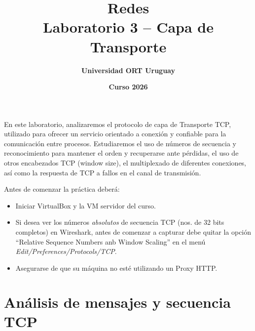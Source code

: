 \documentclass[a4paper,10pt]{article}
\title{\bf Redes\\Laboratorio 3 -- Capa de Transporte}
\author{\bf Universidad ORT Uruguay}
\date{\bf Curso 2026}
\begin{document}
\maketitle
\thispagestyle{fancy}

En este laboratorio, analizaremos el protocolo de capa de Transporte TCP, utilizado para ofrecer un servicio orientado a conexión y confiable para la comunicación entre procesos. Estudiaremos el uso de números de secuencia y reconocimiento para mantener el orden y recuperarse ante pérdidas, el uso de otros encabezados TCP (window size), el multiplexado de diferentes conexiones, así como la respuesta de TCP a fallos en el canal de transmisión.

Antes de comenzar la práctica deberá:
\begin{itemize}
    \item Iniciar VirtualBox y la VM servidor del curso.
    \item Si desea ver los números \emph{absolutos} de secuencia TCP (nos. de 32 bits completos) en Wireshark, antes de comenzar a capturar debe quitar la opción ``Relative Sequence Numbers anb Window Scaling'' en el menú \emph{Edit/Preferences/Protocols/TCP}.
    \item Asegurarse de que su máquina no esté utilizando un Proxy HTTP.
\end{itemize}

\section{Análisis de mensajes y secuencia TCP}
\end{document}
